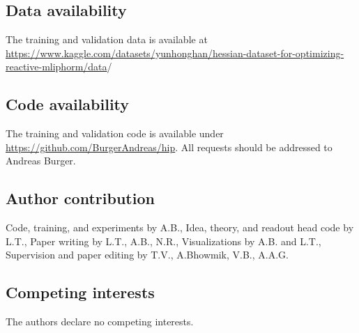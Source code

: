 \documentclass[pdflatex,sn-mathphys-num]{sn-jnl}%
\theoremstyle{thmstyleone}%
\theoremstyle{thmstyletwo}%
\theoremstyle{thmstylethree}%
\begin{document}
\subsection{Data availability}
The training and validation data is available at \url{https://www.kaggle.com/datasets/yunhonghan/hessian-dataset-for-optimizing-reactive-mliphorm/data}/

\subsection{Code availability}
The training and validation code is available under \url{https://github.com/BurgerAndreas/hip}.
All requests should be addressed to Andreas Burger.

\subsection{Author contribution}
Code, training, and experiments by A.B., Idea, theory, and readout head code by L.T., Paper writing by L.T., A.B., N.R., Visualizations by A.B. and L.T., Supervision and paper editing by T.V., A.Bhowmik, V.B., A.A.G.

\subsection{Competing interests}
The authors declare no competing interests.
\end{document}
